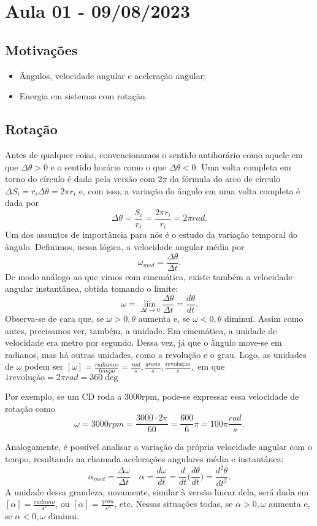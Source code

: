 \documentclass[physicsII_notes.tex]{subfiles}
\begin{document}
\section{Aula 01 - 09/08/2023}
\subsection{Motivações}
\begin{itemize}
	\item Ângulos, velocidade angular e aceleração angular;
	\item Energia em sistemas com rotação.
\end{itemize}
\subsection{Rotação}
Antes de qualquer coisa, convencionamos o sentido antihorário como aquele em que \(\Delta \theta >0\) e
o sentido horário como o que \(\Delta \theta <0.\) Uma volta completa em torno do círculo é dada pela versão com \(2\pi\) da fórmula do arco de círculo
\(\Delta S_{i} = r_{i}\Delta \theta = 2\pi r_{i}\) e, com isso, a variação do ângulo em uma volta completa é dada por
\[
	\Delta \theta = \frac{S_{i}}{r_{i}} = \frac{2\pi r_{i}}{r_{i}} = 2\pi rad.
\]
Um dos assuntos de importância para nós é o estudo da variação temporal do ângulo. Definimos, nessa lógica, a
velocidade angular média por
\[
	\omega _{med} = \frac{\Delta \theta }{\Delta t}.
\]
De modo análogo ao que vimos com cinemática, existe também a velocidade angular instantânea, obtida tomando o limite:
\[
	\omega = \lim_{\Delta t\to 0}\frac{\Delta \theta }{\Delta t} = \frac{d\theta }{dt}.
\]
Observa-se de cara que, se \(\omega >0, \theta \) aumenta e, se \(\omega <0, \theta \) diminui. Assim como antes,
precisamos ver, também, a unidade. Em cinemática, a unidade de velocidade era metro por segundo. Dessa vez, já que
o ângulo move-se em radianos, mas há outras unidades, como a revolução e o grau. Logo, as unidades de \(\omega \) podem ser \([\omega ] = \frac{radianos}{tempo} = \frac{rad}{s}, \frac{graus}{s}, \frac{\text{revolução}}{s},\)
em que \(1\text{revolução} = 2\pi rad = 360\deg\)

Por exemplo, se um CD roda a 3000rpm, pode-se expressar essa velocidade de rotação como
\[
	\omega = 3000rpm = \frac{3000 \cdot 2\pi}{60} = \frac{600}{6}\pi = 100\pi \frac{rad}{s}.
\]

Analogamente, é possível analisar a variação da própria velocidade angular com o tempo, resultando na chamada
acelerações angulares média e instantânea:
\[
	\alpha_{med} = \frac{\Delta \omega }{\Delta t}\quad \alpha  = \frac{d\omega }{dt} = \frac{d}{dt}\biggl(\frac{d\theta }{dt}\biggr) = \frac{d^{2}\theta }{dt^{2}}.
\]
A unidade dessa grandeza, novamente, similar à versão linear dela, será dada em \([\alpha ]= \frac{radiano}{s^{2}}\), ou \([\alpha ]=\frac{grau}{s^{2}}\), etc. Nessas
situações todas, se \(\alpha >0, \omega \) aumenta e, se \(\alpha <0, \omega \) diminui.
\end{document}
